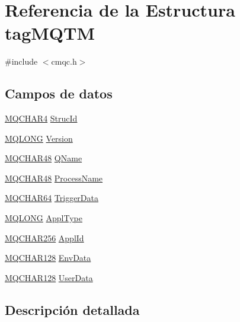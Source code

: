 \hypertarget{structtag_m_q_t_m}{}\section{Referencia de la Estructura tag\+M\+Q\+T\+M}
\label{structtag_m_q_t_m}


{\ttfamily \#include $<$cmqc.\+h$>$}

\subsection*{Campos de datos}
\begin{DoxyCompactItemize}
\item 
\hyperlink{cmqc_8h_a12590e546ed66fda7cf21c1d5cefa31d}{M\+Q\+C\+H\+A\+R4} \hyperlink{structtag_m_q_t_m_a0530922ca944569b52601d74941f96e4}{Struc\+Id}
\item 
\hyperlink{cmqc_8h_a1fb8d28cbda3fa8766a9821230cdb6d5}{M\+Q\+L\+O\+N\+G} \hyperlink{structtag_m_q_t_m_a0656ef8f766b3907d394d88a35d7b7e9}{Version}
\item 
\hyperlink{cmqc_8h_a53b1a2836da03f19144836725ff77919}{M\+Q\+C\+H\+A\+R48} \hyperlink{structtag_m_q_t_m_adb95258c4248dc60e3647d2abab48a52}{Q\+Name}
\item 
\hyperlink{cmqc_8h_a53b1a2836da03f19144836725ff77919}{M\+Q\+C\+H\+A\+R48} \hyperlink{structtag_m_q_t_m_a45e2a82a9d94471dd5e7f07d814b4bfb}{Process\+Name}
\item 
\hyperlink{cmqc_8h_a7be9506b7b722fe66291e424a85afa4a}{M\+Q\+C\+H\+A\+R64} \hyperlink{structtag_m_q_t_m_a172805e57851aa511b91533dd357ab99}{Trigger\+Data}
\item 
\hyperlink{cmqc_8h_a1fb8d28cbda3fa8766a9821230cdb6d5}{M\+Q\+L\+O\+N\+G} \hyperlink{structtag_m_q_t_m_ac4a26a88d1b56f6de408154b461942b9}{Appl\+Type}
\item 
\hyperlink{cmqc_8h_ac492686cf8a90cc3dbc1c48143707ca7}{M\+Q\+C\+H\+A\+R256} \hyperlink{structtag_m_q_t_m_a85937497c4f82d120501b04deb4558a8}{Appl\+Id}
\item 
\hyperlink{cmqc_8h_a7eddcc829f1a614d1a8d2aa5dc2e822d}{M\+Q\+C\+H\+A\+R128} \hyperlink{structtag_m_q_t_m_a852305187782d8464d769e32f9267f12}{Env\+Data}
\item 
\hyperlink{cmqc_8h_a7eddcc829f1a614d1a8d2aa5dc2e822d}{M\+Q\+C\+H\+A\+R128} \hyperlink{structtag_m_q_t_m_a1a68f57af575a62cedaa18c391695747}{User\+Data}
\end{DoxyCompactItemize}


\subsection{Descripción detallada}


